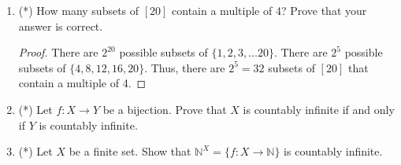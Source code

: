 \documentclass[12pt]{article}
\newcommand{\N}{\mathbb{N}}
\begin{document}
\begin{enumerate}
\begin{proof}
Suppose we wish to select from a group of $n$ people a committee of $k$ people with a president (so there are $k-1$ members plus one president on the committee). There are two ways to do this. First, we could select the $k$ people for the committee from the $n$ total people, and then select the president from the committee of $k$ people so we have ${k \choose 1}{n\choose k} = k{n\choose k}$.

On the other hand, we could first select the committee with $k - 1$ members from the $n$ total people. We then choose the president from the remaining group of people, which is now $n - k + 1$ in size. Using this selection technique we get ${n-k+1 \choose 1}{n\choose k-1} = (n-k+1){n\choose k-1}$. 

Thus, since both sides of the equality count the same set, they are equal. 
\end{proof}

\item (*) How many subsets of $[20]$ contain a multiple of 4? Prove that your answer is correct.

\begin{proof}
There are $2^{20}$ possible subsets of $\{1, 2, 3, \ldots 20\}$. There are $2^5$ possible subsets of $\{4, 8, 12, 16, 20\}$. Thus, there are $2^5 = 32$ subsets of $[20]$ that contain a multiple of 4.  
\end{proof}

\item (*) Let $f:X\to Y$ be a bijection. Prove that $X$ is countably infinite if and only if $Y$ is countably infinite.

\item (*) Let $X$ be a finite set. Show that $\N^X=\{f:X\to \N\}$ is countably infinite.

\end{enumerate}
\end{document}
